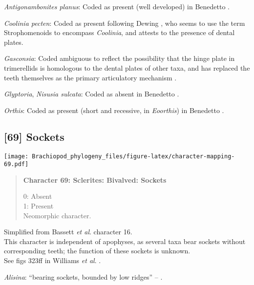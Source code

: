\documentclass[openany]{book}
\theoremstyle{definition}
\theoremstyle{definition}
\theoremstyle{definition}
\theoremstyle{remark}
\begin{document}
\hypertarget{Antigonambonites_planus-coding-68}{}
\emph{Antigonambonites planus}: Coded as present (well developed) in
Benedetto \citeyearpar{Benedetto2009iChaniella}.

\hypertarget{Coolinia_pecten-coding-68}{}
\emph{Coolinia pecten}: Coded as present following Dewing
\citeyearpar{Dewing2001Hingemodifications}, who seems to use the term
Strophomenoids to encompass \emph{Coolinia}, and attests to the presence
of dental plates.

\hypertarget{Gasconsia-coding-68}{}
\emph{Gasconsia}: Coded ambiguous to reflect the possibility that the
hinge plate in trimerellids is homologous to the dental plates of other
taxa, and has replaced the teeth themselves as the primary articulatory
mechanism \citep[see][p.~184, for details of the
articulation]{Williams2000LinguliformeaCraniiformea}.

\hypertarget{Glyptoria-coding-68}{}
\emph{Glyptoria}, \emph{Nisusia sulcata}: Coded as absent in Benedetto
\citeyearpar{Benedetto2009iChaniella}.

\hypertarget{Orthis-coding-68}{}
\emph{Orthis}: Coded as present (short and recessive, in
\emph{Eoorthis}) in Benedetto \citeyearpar{Benedetto2009iChaniella}.

\subsection*{{[}69{]} Sockets}\label{sockets}

\texttt{[image: Brachiopod\_phylogeny\_files/figure-latex/character-mapping-69.pdf]}

\begin{quote}
\textbf{Character 69: Sclerites: Bivalved: Sockets}

0: Absent\\
1: Present\\
Neomorphic character.
\end{quote}

Simplified from Bassett \emph{et al}.
\citeyearpar{Bassett2001Functionalmorphology} character 16.\\
This character is independent of apophyses, as several taxa bear sockets
without corresponding teeth; the function of these sockets is unknown.\\
See figs 323ff in Williams \emph{et al}.
\citeyearpar{Williams1997Introduction}.

\hypertarget{Alisina-coding-69}{}
\emph{Alisina}: ``bearing sockets, bounded by low ridges'' --
\citet{Williams2000LinguliformeaCraniiformea}.
\end{document}
